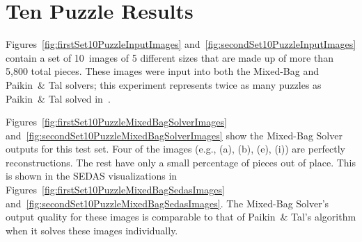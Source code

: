 \chapter{Ten Puzzle Results}\label{chap:tenPuzzleSolving}

Figures~\ref{fig:firstSet10PuzzleInputImages} and~\ref{fig:secondSet10PuzzleInputImages} contain a set of 10~images of 5 different sizes that are made up of more than 5,800 total pieces.  These images were input into both the Mixed-Bag and Paikin~\& Tal solvers; this experiment represents twice as many puzzles as Paikin~\& Tal solved in~\cite{paikin2015}.

Figures~\ref{fig:firstSet10PuzzleMixedBagSolverImages} and~\ref{fig:secondSet10PuzzleMixedBagSolverImages} show the Mixed-Bag Solver outputs for this test set.  Four of the images (e.g., (a), (b), (e), (i)) are perfectly reconstructions.  The rest have only a small percentage of pieces out of place.  This is shown in the SEDAS visualizations in Figures~\ref{fig:firstSet10PuzzleMixedBagSedasImages} and~\ref{fig:secondSet10PuzzleMixedBagSedasImages}.  The Mixed-Bag Solver's output quality for these images is comparable to that of Paikin~\& Tal's algorithm when it solves these images individually.

